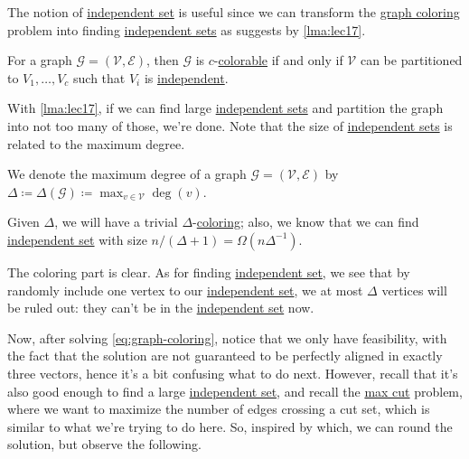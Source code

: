 The notion of \hyperref[def:independent-set]{independent set} is useful since we can transform the \hyperref[prb:graph-coloring]{graph coloring} problem into finding \hyperref[def:independent-set]{independent sets} as suggests by \autoref{lma:lec17}.

\begin{lemma}\label{lma:lec17}
	For a graph \(\mathcal{G} = (\mathcal{V} , \mathcal{E} )\), then \(\mathcal{G} \) is \(c\)-\hyperref[def:coloring]{colorable} if and only if \(\mathcal{V} \) can be partitioned to \(V_1, \ldots, V_c\) such that \(V_i\) is \hyperref[def:independent-set]{independent}.
\end{lemma}

With \autoref{lma:lec17}, if we can find large \hyperref[def:independent-set]{independent sets} and partition the graph into not too many of those, we're done. Note that the size of \hyperref[def:independent-set]{independent sets} is related to the maximum degree.

\begin{notation}
	We denote the maximum degree of a graph \(\mathcal{G}=(\mathcal{V} , \mathcal{E} ) \) by \(\Delta \coloneqq \Delta (\mathcal{G} )\coloneqq \max_{v\in \mathcal{V} } \deg(v)\).
\end{notation}

\begin{remark}
	Given \(\Delta \), we will have a trivial \(\Delta \)-\hyperref[def:coloring]{coloring}; also, we know that we can find \hyperref[def:independent-set]{independent set} with size \(n / (\Delta +1) = \Omega (n \Delta ^{-1} )\).
\end{remark}
\begin{explanation}
	The coloring part is clear. As for finding \hyperref[def:independent-set]{independent set}, we see that by randomly include one vertex to our \hyperref[def:independent-set]{independent set}, we at most \(\Delta \) vertices will be ruled out: they can't be in the \hyperref[def:independent-set]{independent set} now.
\end{explanation}

Now, after solving \autoref{eq:graph-coloring}, notice that we only have feasibility, with the fact that the solution are not guaranteed to be perfectly aligned in exactly three vectors, hence it's a bit confusing what to do next. However, recall that it's also good enough to find a large \hyperref[def:independent-set]{independent set}, and recall the \hyperref[prb:max-cut]{max cut} problem, where we want to maximize the number of edges crossing a cut set, which is similar to what we're trying to do here. So, inspired by which, we can round the solution, but observe the following.

